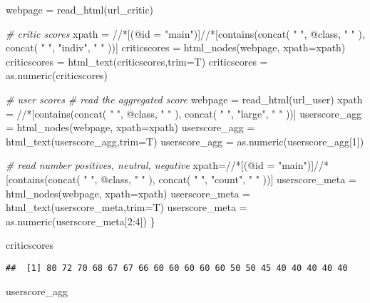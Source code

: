 \documentclass[
  11pt,
]{article}
\newenvironment{Shaded}{\begin{snugshade}}{\end{snugshade}}
\newcommand{\AttributeTok}[1]{\textcolor[rgb]{0.77,0.63,0.00}{#1}}
\newcommand{\CommentTok}[1]{\textcolor[rgb]{0.56,0.35,0.01}{\textit{#1}}}
\newcommand{\DecValTok}[1]{\textcolor[rgb]{0.00,0.00,0.81}{#1}}
\newcommand{\FunctionTok}[1]{\textcolor[rgb]{0.00,0.00,0.00}{#1}}
\newcommand{\NormalTok}[1]{#1}
\newcommand{\OtherTok}[1]{\textcolor[rgb]{0.56,0.35,0.01}{#1}}
\newcommand{\SpecialCharTok}[1]{\textcolor[rgb]{0.00,0.00,0.00}{#1}}
\newcommand{\StringTok}[1]{\textcolor[rgb]{0.31,0.60,0.02}{#1}}
\begin{document}
\begin{Shaded}
\begin{Highlighting}[]
\NormalTok{  webpage }\OtherTok{=} \FunctionTok{read\_html}\NormalTok{(url\_critic)}

  \CommentTok{\# critic scores}
\NormalTok{  xpath }\OtherTok{=} \StringTok{\textquotesingle{}//*[(@id = "main")]//*[contains(concat( " ", @class, " " ), concat( " ", "indiv", " " ))]\textquotesingle{}}
\NormalTok{  criticscores }\OtherTok{=} \FunctionTok{html\_nodes}\NormalTok{(webpage, }\AttributeTok{xpath=}\NormalTok{xpath)}
\NormalTok{  criticscores }\OtherTok{=} \FunctionTok{html\_text}\NormalTok{(criticscores,}\AttributeTok{trim=}\NormalTok{T)}
\NormalTok{  criticscores }\OtherTok{=} \FunctionTok{as.numeric}\NormalTok{(criticscores)}

  \CommentTok{\# user scores}
  \CommentTok{\# read the aggregated score}
\NormalTok{  webpage }\OtherTok{=} \FunctionTok{read\_html}\NormalTok{(url\_user)}
\NormalTok{  xpath }\OtherTok{=} \StringTok{\textquotesingle{}//*[contains(concat( " ", @class, " " ), concat( " ", "large", " " ))]\textquotesingle{}}
\NormalTok{  userscore\_agg }\OtherTok{=} \FunctionTok{html\_nodes}\NormalTok{(webpage, }\AttributeTok{xpath=}\NormalTok{xpath)}
\NormalTok{  userscore\_agg }\OtherTok{=} \FunctionTok{html\_text}\NormalTok{(userscore\_agg,}\AttributeTok{trim=}\NormalTok{T)}
\NormalTok{  userscore\_agg }\OtherTok{=} \FunctionTok{as.numeric}\NormalTok{(userscore\_agg[}\DecValTok{1}\NormalTok{])}

  \CommentTok{\# read number positives, neutral, negative}
\NormalTok{  xpath}\OtherTok{=}\StringTok{\textquotesingle{}//*[(@id = "main")]//*[contains(concat( " ", @class, " " ), concat( " ", "count", " " ))]\textquotesingle{}}
\NormalTok{  userscore\_meta }\OtherTok{=} \FunctionTok{html\_nodes}\NormalTok{(webpage, }\AttributeTok{xpath=}\NormalTok{xpath)}
\NormalTok{  userscore\_meta }\OtherTok{=} \FunctionTok{html\_text}\NormalTok{(userscore\_meta,}\AttributeTok{trim=}\NormalTok{T)}
\NormalTok{  userscore\_meta }\OtherTok{=} \FunctionTok{as.numeric}\NormalTok{(userscore\_meta[}\DecValTok{2}\SpecialCharTok{:}\DecValTok{4}\NormalTok{])}
\NormalTok{\}}

\NormalTok{criticscores}
\end{Highlighting}
\end{Shaded}

\begin{verbatim}
##  [1] 80 72 70 68 67 67 66 60 60 60 60 60 50 50 45 40 40 40 40 40
\end{verbatim}

\begin{Shaded}
\begin{Highlighting}[]
\NormalTok{userscore\_agg}
\end{Highlighting}
\end{Shaded}
\end{document}
